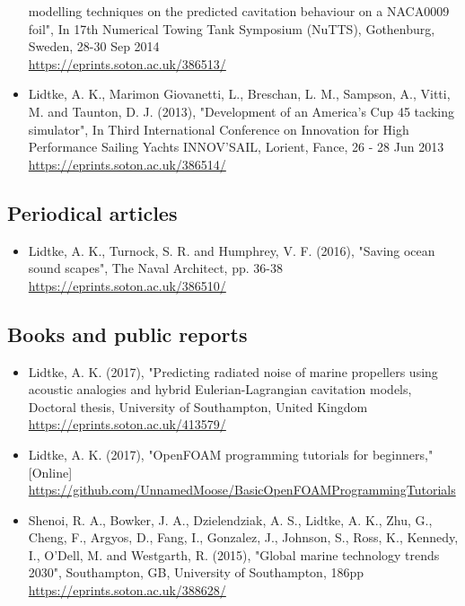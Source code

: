 \documentclass[a4paper,10pt]{article}
\begin{document}
\begin{itemize}
	modelling techniques on the predicted cavitation behaviour on a NACA0009 foil",
	In 17th Numerical Towing Tank Symposium (NuTTS), Gothenburg, Sweden, 28-30 Sep 2014
	\cite{Lidtke2014}
	\\ \url{https://eprints.soton.ac.uk/386513/}
%
\item Lidtke, A. K., Marimon Giovanetti, L., Breschan, L. M., Sampson, A., Vitti, M.
	and Taunton, D. J. (2013), "Development of an America's Cup 45 tacking simulator",
	In Third International Conference on Innovation for High Performance Sailing
	Yachts INNOV’SAIL, Lorient, Fance, 26 - 28 Jun 2013
	\cite{Lidtke2013}
	\\ \url{https://eprints.soton.ac.uk/386514/}
%
\end{itemize}

\subsection{Periodical articles}
%
\begin{itemize}
\item Lidtke, A. K., Turnock, S. R. and Humphrey, V. F. (2016), "Saving ocean sound
	scapes", The Naval Architect, pp. 36-38
	\cite{Lidtke2016c}
	\\ \url{https://eprints.soton.ac.uk/386510/}
%
\end{itemize}

\subsection{Books and public reports}
%
\begin{itemize}
\item Lidtke, A. K. (2017), "Predicting radiated noise of marine propellers using acoustic analogies and hybrid Eulerian-Lagrangian cavitation models,
	Doctoral thesis, University of Southampton, United Kingdom
	\cite{Lidtke2017d}
	\\ \url{https://eprints.soton.ac.uk/413579/}
%
\item Lidtke, A. K. (2017), "OpenFOAM programming tutorials for beginners," [Online]
	\cite{Lidtke2017c}
	\\ \url{https://github.com/UnnamedMoose/BasicOpenFOAMProgrammingTutorials}
%
\item Shenoi, R. A., Bowker, J. A., Dzielendziak, A. S., Lidtke, A. K., Zhu, G., Cheng, F.,
	Argyos, D., Fang, I., Gonzalez, J., Johnson, S., Ross, K., Kennedy, I., O'Dell, M.
	and Westgarth, R. (2015), "Global marine technology trends 2030", Southampton, GB,
	University of Southampton, 186pp
	\cite{Shenoi2015}
	\\ \url{https://eprints.soton.ac.uk/388628/}
%
\end{itemize}
\end{document}
